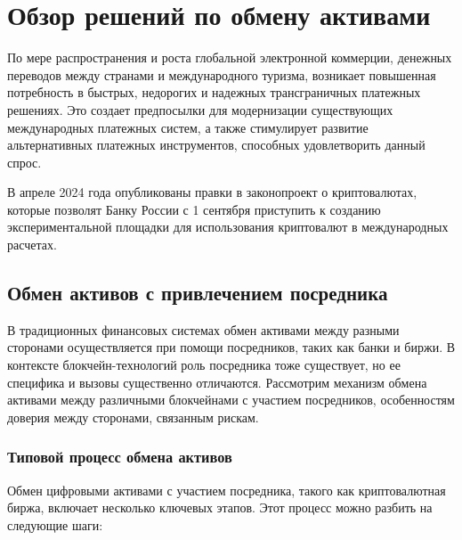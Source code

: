 \chapter{Обзор решений по обмену активами}

По мере распространения и роста глобальной электронной коммерции, денежных переводов между странами и международного туризма, возникает повышенная потребность в быстрых, недорогих и надежных трансграничных платежных решениях. Это создает предпосылки для модернизации существующих международных платежных систем, а также стимулирует развитие альтернативных платежных инструментов, способных удовлетворить данный спрос.

В апреле 2024 года опубликованы правки\cite{label22} в законопроект о криптовалютах, которые позволят Банку России с 1 сентября приступить к созданию экспериментальной площадки для использования криптовалют в международных расчетах.

\section{Обмен активов с привлечением посредника}

В традиционных финансовых системах обмен активами между разными сторонами осуществляется при помощи посредников, таких как банки и биржи. В контексте блокчейн-технологий роль посредника тоже существует, но ее специфика и вызовы существенно отличаются. Рассмотрим механизм обмена активами между различными блокчейнами с участием посредников, особенностям доверия между сторонами, связанным рискам.

\subsection{Типовой процесс обмена активов}

Обмен цифровыми активами с участием посредника, такого как криптовалютная биржа, включает несколько ключевых этапов. Этот процесс можно разбить на следующие шаги:

